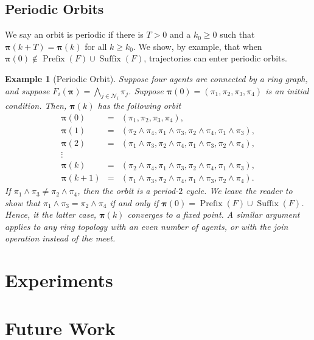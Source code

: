 \documentclass[conference]{ieeeconf}
\newcommand{\N}{\mathcal{N}}
\newcommand{\profile}{\boldsymbol{\pi}}
\newcommand{\meet}{\wedge}
\newcommand{\bigmeet}{\bigwedge}
\renewcommand{\geq}{\geqslant}
\DeclareMathOperator{\Pre}{Prefix}
\DeclareMathOperator{\Post}{Suffix}
\newtheorem{example}{Example}
\begin{document}
\subsection{Periodic Orbits}
We say an orbit is periodic if there is $T>0$ and a $k_0 \geq 0$ such that $\profile(k+T) = \profile(k)$ for all $k \geq k_0$. We show, by example, that when $\profile(0) \notin \Pre(F) \cup \Post(F)$, trajectories can enter periodic orbits.

\begin{example}[Periodic Orbit]
    Suppose four agents are connected by a ring graph, and suppose $F_i(\profile) = \bigmeet_{j \in \N_i} \pi_j$. Suppose $\profile(0) = (\pi_1,\pi_2,\pi_3,\pi_4)$ is an initial condition. Then, $\profile(k)$ has the following orbit
    \begin{align*}
        \profile(0) &=& \left( \pi_1,\pi_2,\pi_3,\pi_4 \right), \\
        \profile(1) &=& \left( \pi_2 \meet \pi_4, \pi_1 \meet \pi_3, \pi_2 \meet \pi_4, \pi_1 \meet \pi_3 \right), \\
        \profile(2) &=& \left( \pi_1 \meet \pi_3, \pi_2 \meet \pi_4, \pi_1 \meet \pi_3, \pi_2 \meet \pi_4 \right), \\
        \vdots &&  \\
        \profile(k) &=& \left( \pi_2 \meet \pi_4, \pi_1 \meet \pi_3, \pi_2 \meet \pi_4, \pi_1 \meet \pi_3 \right), \\
        \profile(k+1) &=& \left( \pi_1 \meet \pi_3, \pi_2 \meet \pi_4, \pi_1 \meet \pi_3, \pi_2 \meet \pi_4 \right).
    \end{align*}
    If $\pi_1 \meet \pi_3 \neq \pi_2 \meet \pi_4$, then the orbit is a period-$2$ cycle. We leave the reader to show that $\pi_1 \meet \pi_3 = \pi_2 \meet \pi_4$ if and only if $\profile(0) = \Pre(F) \cup \Post(F)$. Hence, it the latter case, $\profile(k)$ converges to a fixed point. A similar argument applies to any ring topology with an even number of agents, or with the join operation instead of the meet.
\end{example}


\section{Experiments}
\label{sec:experiments}


\section{Future Work}
\label{sec:future-work}
\end{document}
